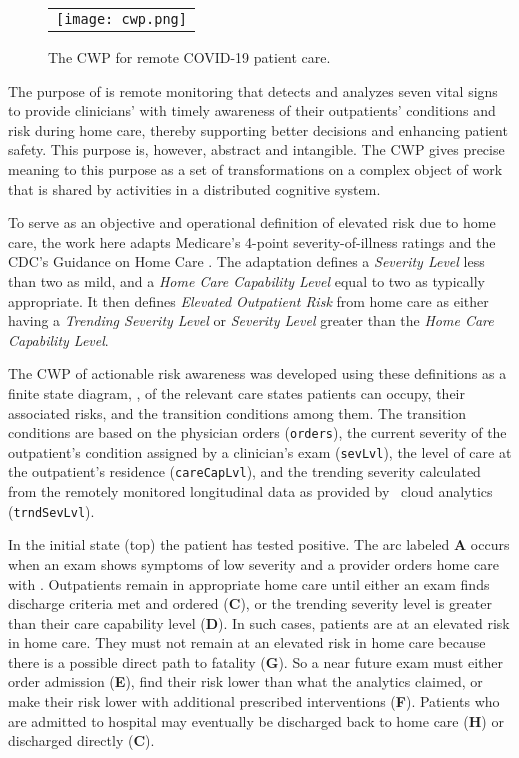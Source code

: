 \begin{figure*}[t]
  \begin{center}
    \begin{tabular}{c}
      \texttt{[image: cwp.png]}
    \end{tabular}
  \end{center}
\caption{The CWP for remote COVID-19 patient care.}
\label{fig:cwp}
\end{figure*}

The purpose of \phware is remote monitoring that detects and analyzes seven vital signs to provide clinicians' with timely awareness of their outpatients' conditions and risk during home care, thereby supporting better decisions and enhancing patient safety. This purpose is, however, abstract and intangible. The CWP gives precise meaning to this purpose as a set of transformations on a complex object of work that is shared by activities in a distributed cognitive system.

To serve as an objective and operational definition of elevated risk due to home care, the work here adapts Medicare's 4-point severity-of-illness ratings \cite{Hornbrook2005OverviewOD,severity} and the CDC's Guidance on Home Care \cite{cdc}. The adaptation defines a \emph{Severity Level} less than two as mild, and a \emph{Home Care Capability Level} equal to two as typically appropriate. It then defines \emph{Elevated Outpatient Risk} from home care as either having a \emph{Trending Severity Level} or \emph{Severity Level} greater than the \emph{Home Care Capability Level}.

The CWP of actionable risk awareness was developed using these definitions as a finite state diagram, , of the relevant care states patients can occupy, their associated risks, and the transition conditions among them. The transition conditions are based on the physician orders (\texttt{orders}), the current severity of the outpatient's condition assigned by a clinician's exam (\texttt{sevLvl}), the level of care at the outpatient's residence (\texttt{careCapLvl}), and the trending severity calculated from the remotely monitored longitudinal data as provided by
\phware\ cloud analytics (\texttt{trndSevLvl}). 

In the initial state (top) the patient has tested positive. The arc labeled \textbf{A} occurs when an exam shows symptoms of low severity and a provider orders home care with \phware. Outpatients remain in appropriate home care until either an exam finds discharge criteria met and ordered (\textbf{C}), or the trending severity level is greater than their care capability level (\textbf{D}). In such cases, patients are at an elevated risk in home care. They must not remain at an elevated risk in home care because there is a possible direct path to fatality (\textbf{G}). So a near future exam must either order admission (\textbf{E}), find their risk lower than what the analytics claimed, or make their risk lower with additional prescribed interventions (\textbf{F}). Patients who are admitted to hospital may eventually be discharged back to home care (\textbf{H}) or discharged directly (\textbf{C}). 

